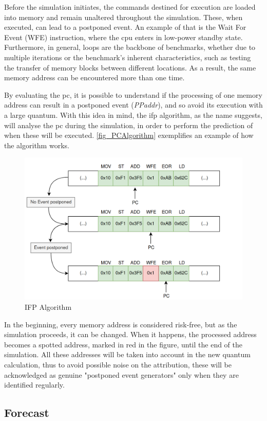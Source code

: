 Before the simulation initiates, the commands destined for execution are loaded into memory and remain unaltered throughout the simulation. These, 
when executed, can lead to a postponed event. An example of that is the Wait For Event (WFE) instruction, where the \gls{cpu} enters in low-power 
standby state. Furthermore, in general, loops are the backbone of benchmarks, whether due to multiple iterations or the benchmark's inherent 
characteristics, such as testing the transfer of memory blocks between different locations. As a result, the same memory address can be 
encountered more than one time. 

By evaluating the \gls{pc}, it is possible to understand if the processing of one memory address can result in a postponed event (\textit{PPaddr}), 
and so avoid its execution with a large quantum. With this idea in mind, the \gls{ifp} algorithm, as the name suggests, will analyse the \gls{pc} during 
the simulation, in order to perform the prediction of when these will be executed. \autoref{fig_PCAlgorithm} exemplifies an example 
of how the algorithm works.

\begin{figure}[h!]
	\centering
 	\includegraphics[width=0.7\linewidth]{Images/PCAlgorithm.png}
 	\caption{IFP Algorithm}
	 \label{fig_PCAlgorithm}
\end{figure}

In the beginning, every memory address is considered risk-free, but as the simulation proceeds, it can be changed. When it happens, the processed 
address becomes a spotted address, marked in red in the figure, until the end of the simulation. All these addresses will be taken into 
account in the new quantum calculation, thus to avoid possible noise on the attribution, these will be acknowledged as genuine 
"postponed event generators" only when they are identified regularly.

 
\subsection{Forecast}

